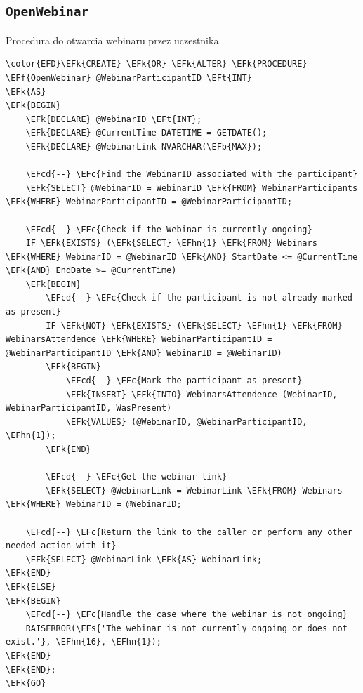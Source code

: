 \documentclass[11pt]{article}
\newcommand{\EFc}[1]{\textcolor{EFc}{\textit{#1}}} %
\newcommand{\EFcd}[1]{\textcolor{EFcd}{\textit{#1}}} %
\newcommand{\EFs}[1]{\textcolor{EFs}{#1}} %
\newcommand{\EFk}[1]{\textcolor{EFk}{\textbf{#1}}} %
\newcommand{\EFb}[1]{\textcolor{EFb}{\textbf{#1}}} %
\newcommand{\EFf}[1]{\textcolor{EFf}{#1}} %
\newcommand{\EFt}[1]{\textcolor{EFt}{\textbf{#1}}} %
\newcommand{\EFhn}[1]{\textcolor{EFhn}{#1}} %
\begin{document}
\subsection{\texttt{OpenWebinar}}
\label{sec:orgc646850}
Procedura do otwarcia webinaru przez uczestnika.
\begin{Code}
\begin{Verbatim}
\color{EFD}\EFk{CREATE} \EFk{OR} \EFk{ALTER} \EFk{PROCEDURE} \EFf{OpenWebinar} @WebinarParticipantID \EFt{INT}
\EFk{AS}
\EFk{BEGIN}
    \EFk{DECLARE} @WebinarID \EFt{INT};
    \EFk{DECLARE} @CurrentTime DATETIME = GETDATE();
    \EFk{DECLARE} @WebinarLink NVARCHAR(\EFb{MAX});

    \EFcd{--} \EFc{Find the WebinarID associated with the participant}
    \EFk{SELECT} @WebinarID = WebinarID \EFk{FROM} WebinarParticipants \EFk{WHERE} WebinarParticipantID = @WebinarParticipantID;

    \EFcd{--} \EFc{Check if the Webinar is currently ongoing}
    IF \EFk{EXISTS} (\EFk{SELECT} \EFhn{1} \EFk{FROM} Webinars \EFk{WHERE} WebinarID = @WebinarID \EFk{AND} StartDate <= @CurrentTime \EFk{AND} EndDate >= @CurrentTime)
    \EFk{BEGIN}
        \EFcd{--} \EFc{Check if the participant is not already marked as present}
        IF \EFk{NOT} \EFk{EXISTS} (\EFk{SELECT} \EFhn{1} \EFk{FROM} WebinarsAttendence \EFk{WHERE} WebinarParticipantID = @WebinarParticipantID \EFk{AND} WebinarID = @WebinarID)
        \EFk{BEGIN}
            \EFcd{--} \EFc{Mark the participant as present}
            \EFk{INSERT} \EFk{INTO} WebinarsAttendence (WebinarID, WebinarParticipantID, WasPresent)
            \EFk{VALUES} (@WebinarID, @WebinarParticipantID, \EFhn{1});
        \EFk{END}

        \EFcd{--} \EFc{Get the webinar link}
        \EFk{SELECT} @WebinarLink = WebinarLink \EFk{FROM} Webinars \EFk{WHERE} WebinarID = @WebinarID;

    \EFcd{--} \EFc{Return the link to the caller or perform any other needed action with it}
    \EFk{SELECT} @WebinarLink \EFk{AS} WebinarLink;
\EFk{END}
\EFk{ELSE}
\EFk{BEGIN}
    \EFcd{--} \EFc{Handle the case where the webinar is not ongoing}
    RAISERROR(\EFs{'The webinar is not currently ongoing or does not exist.'}, \EFhn{16}, \EFhn{1});
\EFk{END}
\EFk{END};
\EFk{GO}
\end{Verbatim}
\end{Code}
\end{document}
